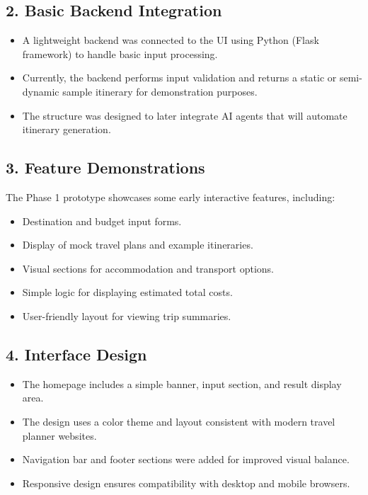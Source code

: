 \subsection{2. Basic Backend Integration}
\begin{itemize}
  \item A lightweight backend was connected to the UI using Python (Flask framework) to handle basic input processing.
  \item Currently, the backend performs input validation and returns a static or semi-dynamic sample itinerary for demonstration purposes.
  \item The structure was designed to later integrate AI agents that will automate itinerary generation.
\end{itemize}

\subsection{3. Feature Demonstrations}
The Phase 1 prototype showcases some early interactive features, including:
\begin{itemize}
  \item Destination and budget input forms.
  \item Display of mock travel plans and example itineraries.
  \item Visual sections for accommodation and transport options.
  \item Simple logic for displaying estimated total costs.
  \item User-friendly layout for viewing trip summaries.
\end{itemize}

\subsection{4. Interface Design}
\begin{itemize}
  \item The homepage includes a simple banner, input section, and result display area.
  \item The design uses a color theme and layout consistent with modern travel planner websites.
  \item Navigation bar and footer sections were added for improved visual balance.
  \item Responsive design ensures compatibility with desktop and mobile browsers.
\end{itemize}

